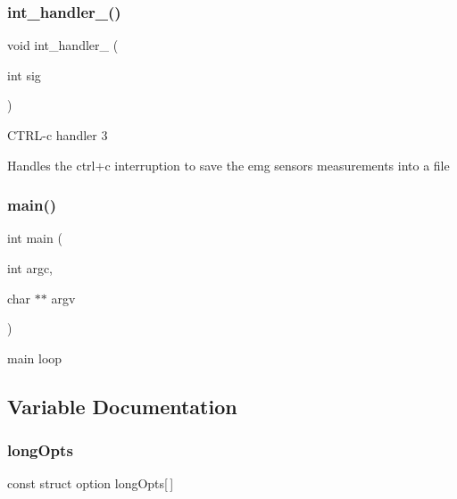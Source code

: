\subsubsection{int\+\_\+handler\+\_()}
{\footnotesize\ttfamily void int\+\_\+handler\+\_ (\begin{DoxyParamCaption}\item[{int}]{sig }\end{DoxyParamCaption})}

C\+T\+R\+L-\/c handler 3

Handles the ctrl+c interruption to save the emg sensors measurements into a file \mbox{\label{qbadmin_8c_a3c04138a5bfe5d72780bb7e82a18e627}} 
\subsubsection{main()}
{\footnotesize\ttfamily int main (\begin{DoxyParamCaption}\item[{int}]{argc,  }\item[{char $\ast$$\ast$}]{argv }\end{DoxyParamCaption})}

main loop 

\subsection{Variable Documentation}
\mbox{\label{qbadmin_8c_a091f2d9683d6ef802780b360f66bad67}} 
\subsubsection{long\+Opts}
{\footnotesize\ttfamily const struct option long\+Opts[$\,$]\hspace{0.3cm}{\ttfamily [static]}}

